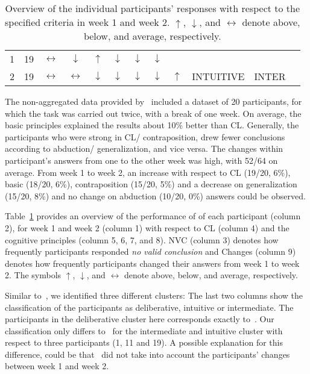 \documentclass[12pt]{article}
\begin{document}
\begin{table}[htp]
\begin{tabular}{cccccccccccc}
1&19&$\leftrightarrow$&$\downarrow$&$\uparrow$&$\downarrow$&$\downarrow$&$\downarrow$ &&&\\
2&19&$\leftrightarrow$&$\leftrightarrow$&$\downarrow$&$\downarrow$&$\downarrow$&$\downarrow$ &\multirow{-2}{*}{$\uparrow$}& \multirow{-2}{*}{INTUITIVE}& \multirow{-2}{*}{INTER}\\ \bottomrule
\end{tabular}
\caption{Overview of the individual participants' responses with respect to the specified criteria in week 1 and week 2.
$\uparrow$, $\downarrow$, and $\leftrightarrow$ denote above, below, and average, respectively.
\label{tab:individual}}
\end{table}

The non-aggregated data provided by~\cite{khemlani:2016} included a dataset of 20 participants,
for which the task was carried out twice, with a break of one week. On average, the basic principles explained the results about 10\;\% better than CL.
 Generally, the participants who were strong in CL/ contraposition, drew fewer conclusions according to abduction/ generalization, and vice versa.
 The changes within participant's answers from one to the other week was high, with 52/64 on average. 
 From week 1 to week 2, an increase with respect to CL (19/20, 6\;\%), basic (18/20, 6\;\%), contraposition (15/20, 5\;\%)
 and a decrease on generalization (15/20, 8\;\%) and no change on abduction (10/20, 0\;\%) answers could be observed.

Table~\ref{tab:individual} provides an overview of the performance of of each participant (column 2), for week 1 and week 2 (column 1)
with respect to CL (column 4) and the cognitive principles (column 5, 6, 7, and 8).
NVC (column 3) denotes how frequently participants responded \textit{no valid conclusion} and Changes (column 9) denotes how
frequently participants changed their answers from week 1 to week 2. 
The symbols $\uparrow$, $\downarrow$, and $\leftrightarrow$ denote above, below, and average, respectively.

Similar to~\cite{khemlani:2016}, we identified three different clusters: 
The last two columns show the classification of the participants as deliberative, intuitive or intermediate. The participants in the deliberative cluster here corresponds exactly to~\cite{khemlani:2016}. 
Our classification only differs to~\cite{khemlani:2016} for the intermediate and intuitive cluster with respect to three participants (1, 11 and 19).
A possible explanation for this difference, could be that~\cite{khemlani:2016}
did not take into account the participants' changes between week 1 and week 2.
\end{document}
